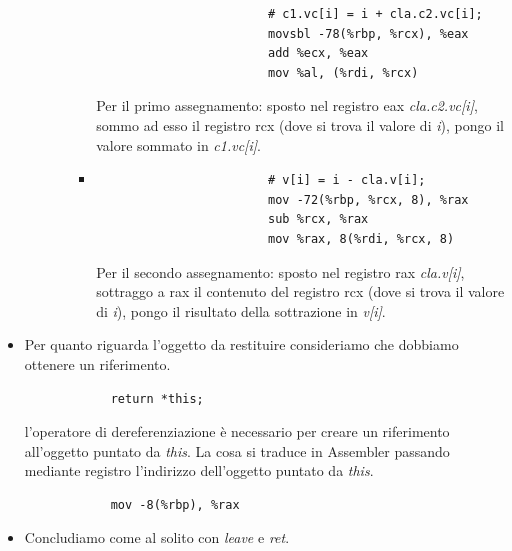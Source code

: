 \begin{itemize}
\begin{itemize}
\begin{itemize}
\begin{itemize}
\begin{verbatim}
						# c1.vc[i] = i + cla.c2.vc[i];
						movsbl -78(%rbp, %rcx), %eax
						add %ecx, %eax
						mov %al, (%rdi, %rcx)
					\end{verbatim}
					Per il primo assegnamento: sposto nel registro eax \emph{cla.c2.vc[i]}, sommo ad esso il registro rcx (dove si trova il valore di \emph{i}), pongo il valore sommato in \emph{c1.vc[i]}.
					\item 
					\begin{verbatim}
						# v[i] = i - cla.v[i];    
						mov -72(%rbp, %rcx, 8), %rax
						sub %rcx, %rax
						mov %rax, 8(%rdi, %rcx, 8)
					\end{verbatim}
					Per il secondo assegnamento: sposto nel registro rax \emph{cla.v[i]}, sottraggo a rax il contenuto del registro rcx (dove si trova il valore di \emph{i}), pongo il risultato della sottrazione in \emph{v[i]}.
				\end{itemize}
			\end{itemize}
		\end{itemize}
		\item Per quanto riguarda l'oggetto da restituire consideriamo che dobbiamo ottenere un riferimento. 
		\begin{verbatim}
			return *this;
		\end{verbatim}
		l'operatore di dereferenziazione è necessario per creare un riferimento all'oggetto puntato da \emph{this}. La cosa si traduce in Assembler passando mediante registro l'indirizzo dell'oggetto puntato da \emph{this}.
		\begin{verbatim}
			mov -8(%rbp), %rax
		\end{verbatim}
		\item Concludiamo come al solito con \emph{leave} e \emph{ret}.
	\end{itemize}
	\endgroup